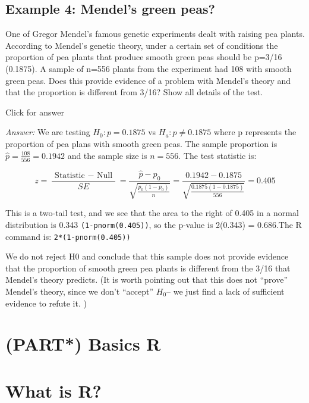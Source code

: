 \documentclass[
]{book}
\begin{document}
\hypertarget{example-4-mendels-green-peas}{%
\section{Example 4: Mendel's green peas?}\label{example-4-mendels-green-peas}}

One of Gregor Mendel's famous genetic experiments dealt with raising pea plants. According to Mendel's genetic theory, under a certain set of conditions the proportion of pea plants that produce smooth green peas should be p=3/16 (0.1875). A sample of n=556 plants from the experiment had 108 with smooth green peas. Does this provide evidence of a problem with Mendel's theory and that the proportion is different from 3/16? Show all details of the test.

Click for answer

\emph{Answer:} We are testing \(H_{0}: p=0.1875\) vs \(H_{a}: p \neq 0.1875\) where p represents the proportion of pea plans with smooth green peas. The sample proportion is \(\hat{p}=\frac{108}{556}=0.1942\) and the sample size is \(n=556\). The test statistic is:

\[z=\frac{\text { Statistic }-\text { Null }}{S E}=\frac{\hat{p}-p_{0}}{\sqrt{\frac{p_{0}\left(1-p_{0}\right)}{n}}}=\frac{0.1942-0.1875}{\sqrt{\frac{0.1875(1-0.1875)}{556}}}=0.405\]

This is a two-tail test, and we see that the area to the right of 0.405 in a normal distribution is 0.343 \texttt{(1-pnorm(0.405))}, so the p-value is 2(0.343) = 0.686.The R command is: \texttt{2*(1-pnorm(0.405))}

We do not reject H0 and conclude that this sample does not provide evidence that the proportion of smooth green pea plants is different from the 3/16 that Mendel's theory predicts. (It is worth pointing out that this does not ``prove'' Mendel's theory, since we don't ``accept'' \(H_0\)-- we just find a lack of sufficient evidence to refute it. )

\hypertarget{part-basics-r}{%
\chapter{(PART*) Basics R}\label{part-basics-r}}

\hypertarget{what-is-r}{%
\chapter{What is R?}\label{what-is-r}}
\end{document}
